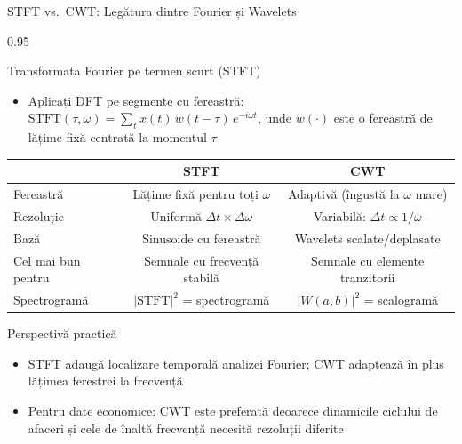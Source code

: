 \documentclass[9pt, aspectratio=169, t]{beamer}
\begin{document}
\begin{frame}{STFT vs.\ CWT: Legătura dintre Fourier și Wavelets}
    \begin{cminipage}{0.95\textwidth}
    \vspace{-2mm}
    \begin{block}{Transformata Fourier pe termen scurt (STFT)}
        \begin{itemize}\setlength{\itemsep}{0pt}
            \item Aplicați DFT pe segmente cu fereastră: $\text{STFT}(\tau, \omega) = \sum_{t} x(t)\,w(t - \tau)\,e^{-i\omega t}$, unde $w(\cdot)$ este o fereastră de lățime fixă centrată la momentul $\tau$
        \end{itemize}
    \end{block}
    \vspace{-2mm}
    {\scriptsize
    \begin{center}
    \begin{tabular}{l|c|c}
        \toprule
        & \textbf{STFT} & \textbf{CWT} \\
        \midrule
        Fereastră & Lățime fixă pentru toți $\omega$ & Adaptivă (îngustă la $\omega$ mare) \\
        Rezoluție & Uniformă $\Delta t \times \Delta \omega$ & Variabilă: $\Delta t \propto 1/\omega$ \\
        Bază & Sinusoide cu fereastră & Wavelets scalate/deplasate \\
        Cel mai bun pentru & Semnale cu frecvență stabilă & Semnale cu elemente tranzitorii \\
        Spectrogramă & $|\text{STFT}|^2$ = spectrogramă & $|W(a,b)|^2$ = scalogramă \\
        \bottomrule
    \end{tabular}
    \end{center}
    }
    \vspace{-2mm}
    \begin{exampleblock}{Perspectivă practică}
        {\small
        \begin{itemize}\setlength{\itemsep}{0pt}
            \item STFT adaugă localizare temporală analizei Fourier; CWT adaptează în plus lățimea ferestrei la frecvență
            \item Pentru date economice: CWT este preferată deoarece dinamicile ciclului de afaceri și cele de înaltă frecvență necesită rezoluții diferite
        \end{itemize}}
    \end{exampleblock}
    \end{cminipage}
\end{frame}
\end{document}
